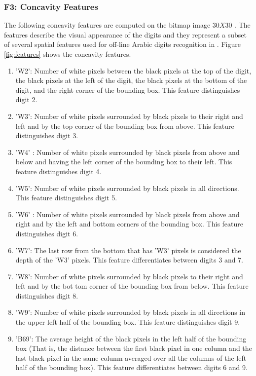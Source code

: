\documentclass[times, 10pt,twocolumn]{article}
\begin{document}
\subsubsection{ F3: Concavity Features}
\label{sec:F3}
The following concavity features are computed on the bitmap image $30X30$  . The features describe the visual appearance of the digits and they represent  a subset of several spatial features used for off-line Arabic digits recognition in \cite{Abdelazeem2009}. Figure \ref{fig:features} shows the concavity features.
\begin{enumerate}
    \item 'W2':  Number of white pixels between the black pixels at the top of the digit, the black pixels at the left of the digit, the black pixels at the bottom of the digit, and the right corner of the bounding box. This feature distinguishes digit 2.
     \item    'W3':  Number of white pixels surrounded by black pixels to their right and left and by the top corner of the bounding box from above. This feature distinguishes digit 3.
   \item 'W4' : Number of white pixels surrounded by black pixels from above and below and having the left corner of the bounding box to their left. This feature distinguishes digit 4.
    \item 'W5': Number of white pixels surrounded by black pixels in all directions. This feature distinguishes digit 5.
     \item  'W6' : Number of white pixels surrounded by black pixels from above and right and by the left and bottom corners of the bounding box. This feature distinguishes digit 6.
      \item  'W7': The last row from the bottom that has 'W3' pixels is considered the depth of the 'W3' pixels. This feature differentiates between digits 3 and 7.%
  \item  'W8':  Number of white pixels surrounded by black pixels to their right and left and by the bot tom corner of the bounding box from below. This feature distinguishes digit 8.
  \item 'W9':  Number of white pixels surrounded by black pixels in all directions in the upper left half of the bounding box. This feature distinguishes digit 9.
   \item 'B69': The average height of the black pixels in the left half of the bounding box (That is, the distance between the first black pixel in one column and the last black pixel in the same colunm averaged over all the columns of the left half of the bounding box). This feature differentiates between digits 6 and 9.
\end{enumerate}
\end{document}
